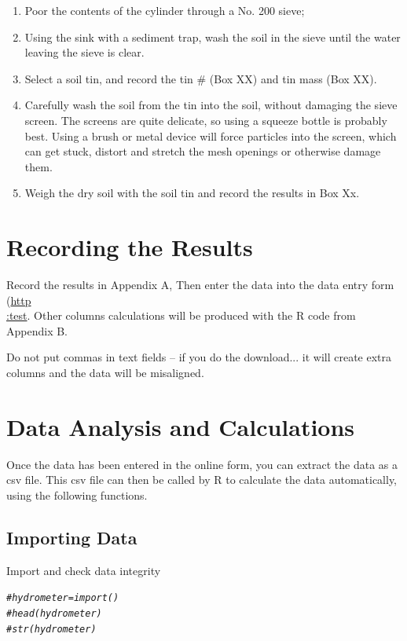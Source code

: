 \documentclass[12pt]{../SOP4_alpha}\usepackage[]{graphicx}\usepackage[]{xcolor}
\makeatletter
\newcommand{\hlcom}[1]{\textcolor[rgb]{0.678,0.584,0.686}{\textit{#1}}}%
\newenvironment{kframe}{%
 \def\at@end@of@kframe{}%
 \ifinner\ifhmode%
  \def\at@end@of@kframe{\end{minipage}}%
  \begin{minipage}{\columnwidth}%
 \fi\fi%
 \def\FrameCommand##1{\hskip\@totalleftmargin \hskip-\fboxsep
 \colorbox{shadecolor}{##1}\hskip-\fboxsep
     \hskip-\linewidth \hskip-\@totalleftmargin \hskip\columnwidth}%
 \MakeFramed {\advance\hsize-\width
   \@totalleftmargin\z@ \linewidth\hsize
   \@setminipage}}%
 {\par\unskip\endMakeFramed%
 \at@end@of@kframe}
\newenvironment{knitrout}{}{} %
\makeatother
\begin{document}
\begin{enumerate}
	\item Poor the contents of the cylinder through a No. 200 sieve;
	\item Using the sink with a sediment trap, wash the soil in the sieve until the water leaving the sieve is clear. 
	\item Select a soil tin, and record the tin \# (Box XX) and tin mass (Box XX). 
	\item Carefully wash the soil from the tin into the soil, without damaging the sieve screen. The screens are quite delicate, so using a squeeze bottle is probably best. Using a brush or metal device will force particles into the screen, which can get stuck, distort and stretch the mesh openings or otherwise damage them. 
	\item Weigh the dry soil with the soil tin and record the results in Box Xx.
\end{enumerate}

\section{Recording the Results}

Record the results in Appendix A, Then enter the data into the data entry form (\href{test}{http\\:test}. Other columns calculations will be produced with the R code from Appendix B.  

Do not put commas in text fields -- if you do the download... it will create extra columns and the data will be misaligned.

\section{Data Analysis and Calculations}

Once the data has been entered in the online form, you can extract the data as a csv file. This csv file can then be called by R to calculate the data automatically, using the following functions. 

\subsection*{Importing Data}

Import and check data integrity

\begin{knitrout}
\color{fgcolor}\begin{kframe}
\begin{alltt}
\hlcom{#hydrometer = import()}
\hlcom{#head(hydrometer)}
\hlcom{#str(hydrometer)}
\end{alltt}
\end{kframe}
\end{knitrout}
\end{document}
